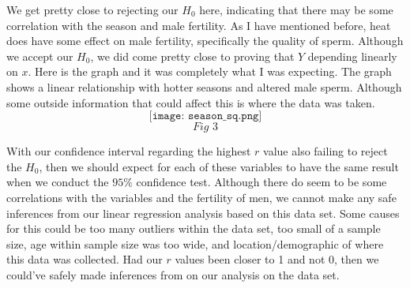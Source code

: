 \documentclass{article}
\begin{document}
	We get pretty close to rejecting our $H_{0}$ here, indicating that there may be some correlation with the season and male fertility. As I have mentioned before, heat does have some effect on male fertility, specifically the quality of sperm. Although we accept our $H_{0}$, we did come pretty close to proving that $Y$ depending linearly on $x$. Here is the graph and it was completely what I was expecting. The graph shows a linear relationship with hotter seasons and altered male sperm. Although some outside information that could affect this is where the data was taken.
	$$\texttt{[image: season\_sq.png]}$$
	$$\textit{Fig 3}$$

	With our confidence interval regarding the highest $r$ value also failing to reject the $H_{0}$, then we should expect for each of these variables to have the same result when we conduct the $95\%$ confidence test. Although there do seem to be some correlations with the variables and the fertility of men, we cannot make any safe inferences from our linear regression analysis based on this data set. Some causes for this could be too many outliers within the data set, too small of a sample size, age within sample size was too wide, and location/demographic of where this data was collected. Had our $r$ values been closer to 1 and not 0, then we could've safely made inferences from on our analysis on the data set.
\end{document}
